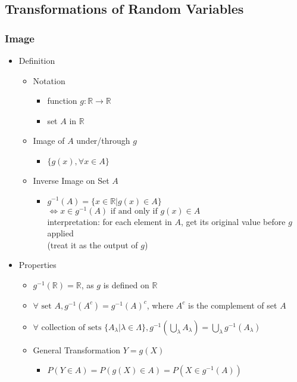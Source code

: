 \subsection{Transformations of Random Variables}

\subsubsection{Image}
\begin{itemize}
\item Definition
	\begin{itemize}
	\item Notation
		\begin{itemize}
		\item function $g:\mathbb{R} \rightarrow \mathbb{R}$
		\item set $A$ in $\mathbb{R}$
		\end{itemize}
	\item Image of $A$ under/through $g$
		\begin{itemize}
		\item $\{g(x), \forall x\in A\}$ 
		\end{itemize}
	\item Inverse Image on Set $A$
		\begin{itemize}
		\item $\displaystyle g^{-1}(A) = \{x\in\mathbb{R}|g(x)\in A\}$ \\ 
		$\Leftrightarrow x\in g^{-1}(A) \text{ if and only if } g(x) \in A$ \\
		interpretation: for each element in $A$, get its original value before $g$ applied \\
		(treat it as the output of $g$)
		\end{itemize}
	\end{itemize}
\item Properties
	\begin{itemize}
	\item $g^{-1}(\mathbb{R}) = \mathbb{R}$, as $g$ is defined on $\mathbb{R}$
	\item $\forall \text{ set } A, g^{-1}(A^c) = g^{-1}(A)^c$, where $A^c$ is the complement of set $A$
	\item $\displaystyle \forall \text{ collection of sets } \{A_\lambda | \lambda \in \Lambda\}, g^{-1}\left( \bigcup_\lambda A_\lambda \right) = \bigcup_\lambda g^{-1}(A_\lambda)$
	\item General Transformation $Y=g(X)$
		\begin{itemize}
		\item $P(Y\in A) = P(g(X)\in A) = P(X \in g^{-1}(A))$
		\end{itemize}
	\end{itemize}
\end{itemize}


